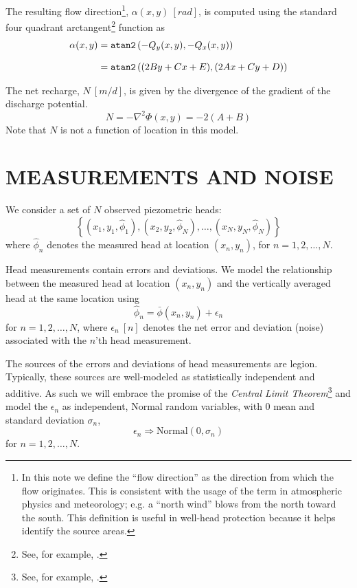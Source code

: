 \documentclass[12pt]{article}
\begin{document}
The resulting flow direction\footnote{In this note we define the ``flow direction'' as the direction from which the flow originates. This is consistent with the usage of the term in atmospheric physics and meteorology; e.g. a ``north wind'' blows from the north toward the south.  This definition is useful in well-head protection because it helps identify the source areas.}, $\alpha(x,y)~[rad]$, is computed using the standard four quadrant arctangent\footnote{See, for example, \cite{wiki:atan2}.} function as
%
\begin{align}\label{2.11}
    \alpha(x,y)
    &= \text{\tt atan2}\left(-Q_y(x,y), -Q_x(x,y)\right) \nonumber\\[8pt]
    &= \text{\tt atan2}\left((2By + Cx + E), (2Ax + Cy + D)\right)
\end{align}

The net recharge, $N~[m/d]$, is given by the divergence of the gradient of the discharge potential.
%
\begin{equation}\label{2.12}
    N = -\nabla^2 \Phi(x,y) = -2(A+B)
\end{equation}
%
Note that $N$ is not a function of location in this model.


\section{MEASUREMENTS AND NOISE}
We consider a set of $N$ observed piezometric heads:
%
\begin{equation}\label{3.1}
	\left\{ (x_1,y_1,\hat{\phi}_1), (x_2,y_2,\hat{\phi}_N), \ldots, (x_N,y_N,\hat{\phi}_N) \right\}
\end{equation}
%
where $\hat{\phi}_n$ denotes the measured head at location $(x_n,y_n)$, for $n = 1, 2, \ldots, N$.

Head measurements contain errors and deviations.  We model the relationship between the measured head at location $(x_n, y_n)$ and the vertically averaged head at the same location using
%
\begin{equation}\label{3.2}
	\hat{\phi}_n = \bar{\phi}(x_n, y_n) + \epsilon_n
\end{equation}
%
for $n = 1, 2, \ldots, N$, where $\epsilon_n~[n]$ denotes the net error and deviation (noise) associated with the $n$'th head measurement.

The sources of the errors and deviations of head measurements are legion.  Typically, these sources are well-modeled as statistically independent and additive.  As such we will embrace the promise of the {\em Central Limit Theorem}\footnote{See, for example, \citet{wiki:clt}.} and model the $\epsilon_n$ as independent, Normal random variables, with $0$ mean and standard deviation $\sigma_n$,
%
\begin{equation}\label{3.3}
    \epsilon_n \Rightarrow \text{Normal}(0, \sigma_n)
\end{equation}
%
for $n=1,2,\ldots,N$.
\end{document}
